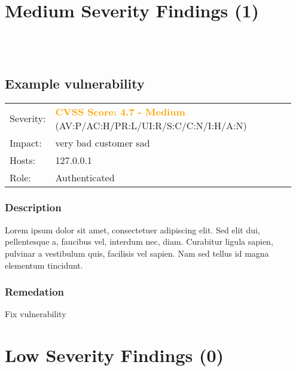 \documentclass{article}
\begin{document}
\section{Medium Severity Findings (1)}
\\\\
\subsection{Example vulnerability}
\begin{table}[h]
    \centering
    \begin{tabular}{|p{0.1\linewidth} | p{0.85\linewidth}|} \rowcolor{orange}
        \hline & \\
        \hline Severity: & \textcolor{orange}{\textbf{CVSS Score: 4.7 - Medium}} (AV:P/AC:H/PR:L/UI:R/S:C/C:N/I:H/A:N)\\
        \hline Impact: & very bad customer sad  \\
        \hline Hosts: & 127.0.0.1 \\
        \hline Role: &Authenticated \\
        \hline
    \end{tabular}
\end{table}
\vspace{-7mm}

\subsubsection*{Description}
Lorem ipsum dolor sit amet, consectetuer adipiscing elit. Sed elit dui, pellentesque a, faucibus vel, interdum nec, diam. Curabitur ligula sapien, pulvinar a vestibulum quis, facilisis vel sapien. Nam sed tellus id magna elementum tincidunt.  



\subsubsection*{Remedation}
Fix vulnerability   

\newpage
\section{Low Severity Findings (0)}
\end{document}
